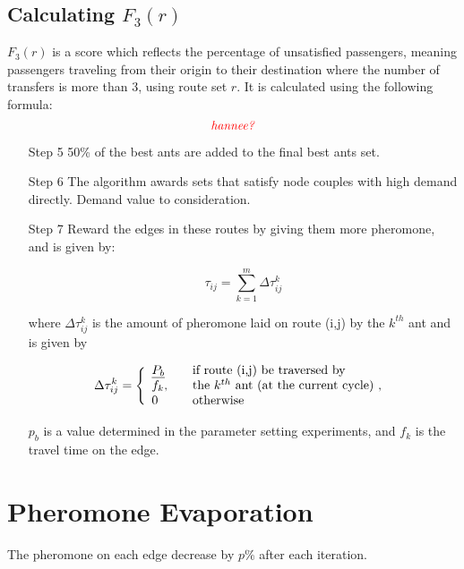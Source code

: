 
\subsection{Calculating $F_3(r)$}
$F_3(r)$ is a score which reflects the percentage of unsatisfied passengers, meaning passengers traveling from their origin to their destination where the number of transfers is more than 3, using route set $r$. It is calculated using the following formula:
$$\emph{\color{red}hannee?}$$

\begin{itemize}
\item[Step 5] 50\% of the best ants are added to the final best ants set.
\item[Step 6] The algorithm awards sets that satisfy node couples with high demand directly. Demand value to consideration.
\item[Step 7] Reward the edges in these routes by giving them more pheromone, and is given by:

$$ \tau_{ij} = \sum_{k=1}^{m} \Delta \tau^k_{ij}$$

where $ \Delta \tau^k_{ij} $ is the amount of pheromone laid on route (i,j) by the $k^{th}$ ant and is given by

$$
\Delta \tau^k_{ij} = \Bigg\{
\begin{array}{l l}
\underline{P_{b}} &  \quad \text{if route (i,j) be traversed by}\\
f_k, &  \quad \text{the $k^{th}$ ant (at the current cycle) , }\\
0 &  \quad \text{otherwise}
\end{array}
$$

$p_b$ is a value determined in the parameter setting experiments, and $f_k$ is the travel time on the edge.

\end{itemize}

\section{Pheromone Evaporation}

The pheromone on each edge decrease by $p\%$ after each iteration. 